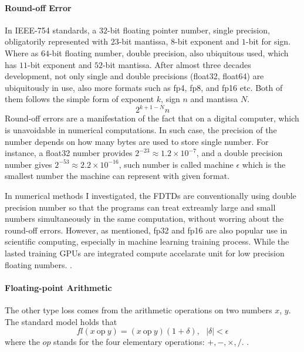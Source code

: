 \paragraph{Round-off Error}
In IEEE-754 \cite{IEEE_754} standards, a $32$-bit floating pointer number, single precision, obligatorily represented with $23$-bit mantissa, 
$8$-bit exponent and $1$-bit for sign. 
Where as $64$-bit floating number, double precision, also ubiquitous used, which has $11$-bit exponent and $52$-bit mantissa.
After almost three decades development, not only single and double precisions (float32, float64) are ubiquitously in use, 
also more formats such as fp4, fp8, and fp16 etc. Both of them follows the simple form of exponent $k$, sign $n$ and mantissa $N$. 
\cite{IEEE_754_p2_eq1}
\begin{equation*}
  2^{k+1-N}n
\end{equation*}
Round-off errors are a manifestation of the fact that on a digital computer, which is unavoidable in numerical computations.
In such case, the precision of the number depends on how many bytes are used to store single number. 
For instance, a float32 number provides $2^{-23} \approx 1.2\times10^{-7}$, and a double precision number gives $2^{-53} \approx 2.2\times10^{-16}$, 
such number is called machine $\epsilon$ which is the smallest number the machine can represent with given format.

In numerical methods I investigated, the FDTDs are conventionally using double precision number so that the programs can treat extreamly large and small 
numbers simultaneously in the same computation, without worring about the round-off errors.
However, as mentioned, fp32 and fp16 are also popular use in scientific computing, especially in machine learning training process. 
While the lasted training GPUs are integrated compute accelarate unit for low precision floating numbers. \cite{NVIDIA_HB200_PAPER}.

\paragraph{Floating-point Arithmetic}
The other type loss comes from the arithmetic operations on two numbers $x$, $y$. 
The standard model holds that 
\begin{equation}
  fl(x \:\text{op}\: y) = (x \: \text{op} \: y) (1+\delta), \:\:\: \left|\delta\right| < \epsilon
\end{equation}
where the $op$ stands for the four elementary operations: $+, -, \times, /$. \cite{Germund,NMSC,V1,P112}.




